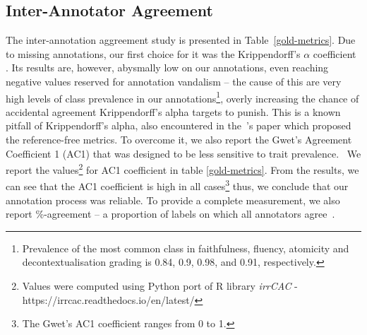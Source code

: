 \subsection{Inter-Annotator Agreement}
The inter-annotation aggreement study is presented in Table~\ref{gold-metrics}.
Due to missing annotations, our first choice for it was the Krippendorff's $\alpha$ coefficient \cite{krippendorff2011computing}.
Its results are, however, abysmally low on our annotations, even reaching negative values reserved for annotation vandalism -- the cause of this are very high levels of class prevalence in our annotations\footnote{Prevalence of the most common class in faithfulness, fluency, atomicity and decontextualisation grading is 0.84, 0.9, 0.98, and 0.91, respectively.}, overly increasing the chance of accidental agreement Krippendorff's alpha targets to punish.
This is a known pitfall of Krippendorff's alpha, also encountered in the~\citealt{wright-etal-2022-generating}'s paper which proposed the reference-free metrics.
To overcome it, we also report the Gwet's Agreement Coefficient 1 (AC1) that was designed to be less sensitive to trait prevalence.~\cite{gwet2010handbook}
We report the values\footnote{Values were computed using Python port of R library \textit{irrCAC} - https://irrcac.readthedocs.io/en/latest/} for AC1 coefficient in table \ref{gold-metrics}.
From the results, we can see that the AC1 coefficient is high in all cases\footnote{The Gwet's AC1 coefficient ranges from 0 to 1.} thus, we conclude that our annotation process was reliable. To provide a complete measurement, we also report \%-agreement -- a proportion of labels on which all annotators agree~\cite{Artstein2017}.

